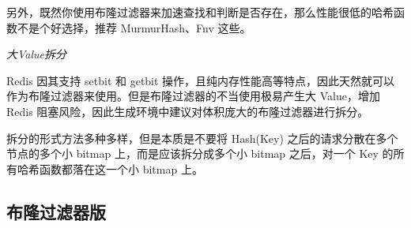 \documentclass[cn,11pt,chinese]{elegantbook}
\begin{document}
另外，既然你使用布隆过滤器来加速查找和判断是否存在，那么性能很低的哈希函数不是个好选择，推荐
MurmurHash、Fnv 这些。

\emph{大Value拆分}

Redis 因其支持 setbit 和 getbit
操作，且纯内存性能高等特点，因此天然就可以作为布隆过滤器来使用。但是布隆过滤器的不当使用极易产生大
Value，增加 Redis
阻塞风险，因此生成环境中建议对体积庞大的布隆过滤器进行拆分。

拆分的形式方法多种多样，但是本质是不要将 Hash(Key)
之后的请求分散在多个节点的多个小 bitmap 上，而是应该拆分成多个小 bitmap
之后，对一个 Key 的所有哈希函数都落在这一个小 bitmap 上。

\hypertarget{ux5e03ux9686ux8fc7ux6ee4ux5668ux7248}{%
\subsection{布隆过滤器版}\label{ux5e03ux9686ux8fc7ux6ee4ux5668ux7248}}
\end{document}
